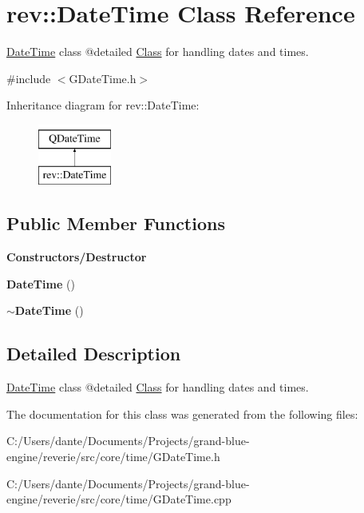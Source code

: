\hypertarget{classrev_1_1_date_time}{}\section{rev\+::Date\+Time Class Reference}
\label{classrev_1_1_date_time}


\mbox{\hyperlink{classrev_1_1_date_time}{Date\+Time}} class @detailed \mbox{\hyperlink{struct_class}{Class}} for handling dates and times.  




{\ttfamily \#include $<$G\+Date\+Time.\+h$>$}

Inheritance diagram for rev\+::Date\+Time\+:\begin{figure}[H]
\begin{center}
\leavevmode
\includegraphics[height=2.000000cm]{classrev_1_1_date_time}
\end{center}
\end{figure}
\subsection*{Public Member Functions}
\begin{Indent}\textbf{ Constructors/\+Destructor}\par
\begin{DoxyCompactItemize}
\item 
\mbox{\label{classrev_1_1_date_time_abb0c659efbfb15ea0f10947f7e40c8d8}} 
{\bfseries Date\+Time} ()
\item 
\mbox{\label{classrev_1_1_date_time_ab6168a4e830ebdae6fa8a940b26fbb59}} 
{\bfseries $\sim$\+Date\+Time} ()
\end{DoxyCompactItemize}
\end{Indent}


\subsection{Detailed Description}
\mbox{\hyperlink{classrev_1_1_date_time}{Date\+Time}} class @detailed \mbox{\hyperlink{struct_class}{Class}} for handling dates and times. 

The documentation for this class was generated from the following files\+:\begin{DoxyCompactItemize}
\item 
C\+:/\+Users/dante/\+Documents/\+Projects/grand-\/blue-\/engine/reverie/src/core/time/G\+Date\+Time.\+h\item 
C\+:/\+Users/dante/\+Documents/\+Projects/grand-\/blue-\/engine/reverie/src/core/time/G\+Date\+Time.\+cpp\end{DoxyCompactItemize}
